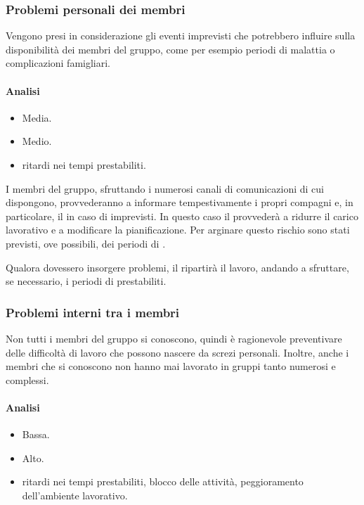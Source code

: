 \documentclass[a4paper, titlepage]{article}
\begin{document}
	\subsubsection{Problemi personali dei membri}
	Vengono presi in considerazione gli eventi imprevisti che potrebbero influire sulla disponibilità dei membri del gruppo, come per esempio periodi di malattia o complicazioni famigliari.
	
	\paragraph {Analisi}
	\begin{itemize}
		\item {} Media.
		\item {} Medio.
		\item {} ritardi nei tempi prestabiliti.
	\end{itemize}
	
	I membri del gruppo, sfruttando i numerosi canali di comunicazioni di cui dispongono, provvederanno a informare tempestivamente i propri compagni e, in particolare, il  in caso di imprevisti. In questo caso il  provvederà a ridurre il carico lavorativo e a modificare la pianificazione. Per arginare questo rischio sono stati previsti, ove possibili, dei periodi di .
	
	Qualora dovessero insorgere problemi, il  ripartirà il lavoro, andando a sfruttare, se necessario, i periodi di  prestabiliti. 
	
	\subsubsection{Problemi interni tra i membri}
	Non tutti i membri del gruppo si conoscono, quindi è ragionevole preventivare delle difficoltà di lavoro che possono nascere da screzi personali. Inoltre, anche i membri che si conoscono non hanno mai lavorato in gruppi tanto numerosi e complessi.
	
	\paragraph {Analisi}
	\begin{itemize}
		\item {} Bassa.
		\item {} Alto.
		\item {} ritardi nei tempi prestabiliti, blocco delle attività, peggioramento dell'ambiente lavorativo.
	\end{itemize}
	
\end{document}
